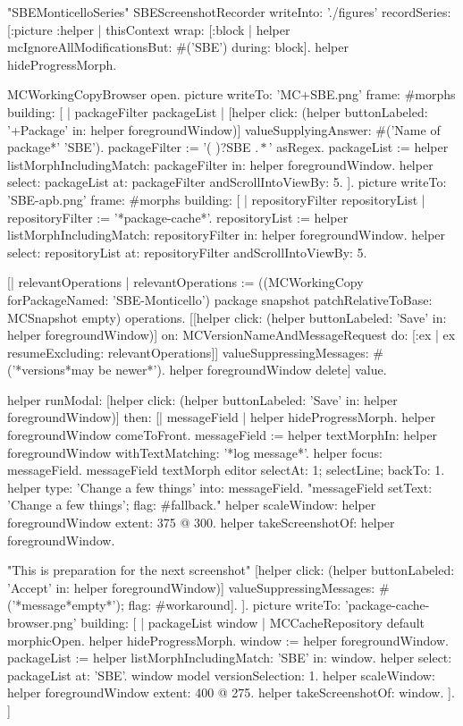 \documentclass[a4paper,10pt,twoside]{book}
\begin{document}
\begin{ExecuteSmalltalkScript}
"SBEMonticelloSeries"
SBEScreenshotRecorder writeInto: './figures' recordSeries: [:picture :helper |
	thisContext wrap: [:block | helper mcIgnoreAllModificationsBut: #('SBE') during: block].
	helper hideProgressMorph.
	
	MCWorkingCopyBrowser open.
	picture writeTo: 'MC+SBE.png' frame: #morphs building: [
		| packageFilter packageList |
		[helper click: (helper buttonLabeled: '+Package' in: helper foregroundWindow)]
			valueSupplyingAnswer: #('Name of package*' 'SBE').
		packageFilter := '(\* )?SBE \(.*\)' asRegex.
		packageList := helper listMorphIncludingMatch: packageFilter in: helper foregroundWindow.
		helper select: packageList at: packageFilter andScrollIntoViewBy: 5.
	].
	picture writeTo: 'SBE-apb.png' frame: #morphs building: [
		| repositoryFilter repositoryList |
		repositoryFilter := '*package-cache*'.
		repositoryList := helper listMorphIncludingMatch: repositoryFilter in: helper foregroundWindow.
		helper select: repositoryList at: repositoryFilter andScrollIntoViewBy: 5.
		
		[| relevantOperations |
		relevantOperations := ((MCWorkingCopy forPackageNamed: 'SBE-Monticello') package snapshot
			patchRelativeToBase: MCSnapshot empty) operations.
		[[helper click: (helper buttonLabeled: 'Save' in: helper foregroundWindow)]
			on: MCVersionNameAndMessageRequest
			do: [:ex | ex resumeExcluding: relevantOperations]]
				valueSuppressingMessages: #('*versions*may be newer*').
		helper foregroundWindow delete] value.
		
		helper
			runModal: [helper click: (helper buttonLabeled: 'Save' in: helper foregroundWindow)]
			then: [| messageField |
				helper hideProgressMorph.
				helper foregroundWindow comeToFront.
				messageField := helper textMorphIn: helper foregroundWindow withTextMatching: '*log message*'.
				helper focus: messageField.
				messageField textMorph editor selectAt: 1; selectLine; backTo: 1.
				helper type: 'Change a few things' into: messageField.
				"messageField setText: 'Change a few things'; flag: #fallback."
				helper scaleWindow: helper foregroundWindow extent: 375 @ 300.
				helper takeScreenshotOf: helper foregroundWindow.
				
				"This is preparation for the next screenshot"
				[helper click: (helper buttonLabeled: 'Accept' in: helper foregroundWindow)]
					valueSuppressingMessages: #('*message*empty*');
					flag: #workaround].
	].
	picture writeTo: 'package-cache-browser.png' building: [
		| packageList window |
		MCCacheRepository default morphicOpen.
		helper hideProgressMorph.
		window := helper foregroundWindow.
		packageList := helper listMorphIncludingMatch: 'SBE' in: window.
		helper select: packageList at: 'SBE'.
		window model versionSelection: 1.
		helper scaleWindow: helper foregroundWindow extent: 400 @ 275.
		helper takeScreenshotOf: window.
	].
]
\end{ExecuteSmalltalkScript}
\end{document}
